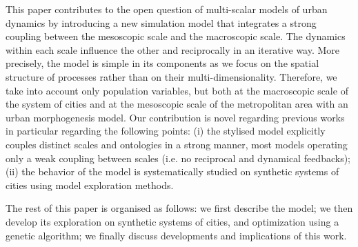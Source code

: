 \documentclass[ijgi,article,submit,moreauthors,pdftex]{Definitions/mdpi}
\begin{document}
This paper contributes to the open question of multi-scalar models of urban dynamics by introducing a new simulation model that integrates a strong coupling between the mesoscopic scale and the macroscopic scale. The dynamics within each scale influence the other and reciprocally in an iterative way. More precisely, the model is simple in its components as we focus on the spatial structure of processes rather than on their multi-dimensionality. Therefore, we take into account only population variables, but both at the macroscopic scale of the system of cities and at the mesoscopic scale of the metropolitan area with an urban morphogenesis model. Our contribution is novel regarding previous works in particular regarding the following points: (i) the stylised model explicitly couples distinct scales and ontologies in a strong manner, most models operating only a weak coupling between scales (i.e. no reciprocal and dynamical feedbacks); (ii) the behavior of the model is systematically studied on synthetic systems of cities using model exploration methods.
 
 
The rest of this paper is organised as follows: we first describe the model; we then develop its exploration on synthetic systems of cities, and optimization using a genetic algorithm; we finally discuss developments and implications of this work.


\end{document}
